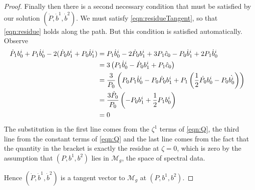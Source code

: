 \begin{lem}[Case (i)]
\begin{proof}
Finally then there is a second necessary condition that must be satisfied by our solution $(\dot{P},\dot{b}^1,\dot{b}^2)$. We must satisfy \eqref{eqn:residueTangent}, so that \eqref{eqn:residue} holds along the path. But this condition is satisfied automatically. Observe
\begin{align*}
\dot{P}_1 b^i_0 + P_1 \dot{b}^i_0 - 2(\dot{P}_0 b^i_1 + P_0 \dot{b}^i_1)
&= P_1\dot{b}^i_0 - 2\dot{P}_0b^i_1 + 3P_1\hat{c}_0 - P_0\dot{b}^i_1 + 2P_1\dot{b}^i_0 \\
&= 3\left( P_1\dot{b}^i_0 - \dot{P}_0b^i_1 + P_1\hat{c}_0\right) \\
&= \frac{3}{P_0}\left( P_0P_1\dot{b}^i_0 - P_0\dot{P}_0b^i_1 + P_1\left( \frac{1}{2}\dot{P_0}b^i_0 - P_0\dot{b^i_0} \right)\right) \\
&= \frac{3\dot{P}_0}{P_0}\left( - P_0b^i_1 + \frac{1}{2}P_1b^i_0 \right)\\
&= 0
\end{align*}
The substitution in the first line comes from the $ζ^1$ terms of \eqref{eqn:Q}, the third line from the constant terms of \eqref{eqn:Q} and the last line comes from the fact that the quantity in the bracket is exactly the residue at $ζ=0$, which is zero by the assumption that $(P,b^1,b^2)$ lies in $\mathcal{M}_g$, the space of spectral data.

Hence $(\dot{P},\dot{b}^1,\dot{b}^2)$ is a tangent vector to $\mathcal{M}_g$ at $(P,b^1,b^2)$.
\end{proof}
\end{lem}










